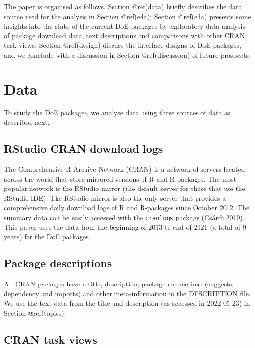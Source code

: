 \documentclass{article}
\begin{document}
The paper is organised as follows. Section @ref(data) briefly describes
the data source used for the analysis in Section @ref(eda); Section
@ref(eda) presents some insights into the state of the current DoE
packages by exploratory data analysis of package download data, text
descriptions and comparisons with other CRAN task views; Section
@ref(design) discuss the interface designs of DoE packages, and we
conclude with a discussion in Section @ref(discussion) of future
prospects.

\hypertarget{data}{%
\section{Data}\label{data}}

To study the DoE packages, we analyse data using three sources of data
as described next.

\hypertarget{rstudio-cran-download-logs}{%
\subsection{RStudio CRAN download
logs}\label{rstudio-cran-download-logs}}

The Comprehensive R Archive Network (CRAN) is a network of servers
located across the world that store mirrored versions of R and
R-packages. The most popular network is the RStudio mirror (the default
server for those that use the RStudio IDE). The RStudio mirror is also
the only server that provides a comprehensive daily download logs of R
and R-packages since October 2012. The summary data can be easily
accessed with the \texttt{cranlogs} package (Csárdi 2019). This paper
uses the data from the beginning of 2013 to end of 2021 (a total of 9
years) for the DoE packages.

\hypertarget{package-descriptions}{%
\subsection{Package descriptions}\label{package-descriptions}}

All CRAN packages have a title, description, package connections
(suggests, dependency and imports) and other meta-information in the
DESCRIPTION file. We use the text data from the title and description
(as accessed in 2022-05-23) in Section @ref(topics).

\hypertarget{cran-task-views}{%
\subsection{CRAN task views}\label{cran-task-views}}
\end{document}
